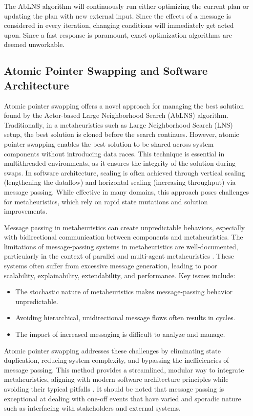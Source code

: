 The AbLNS algorithm will continuously run either optimizing the current plan or updating the plan 
with new external input. Since the effects of a message is considered in every iteration, changing 
conditions will immediately get acted upon. Since a fast response is paramount, exact optimization algorithms are deemed unworkable.

\subsection{Atomic Pointer Swapping and Software Architecture}
Atomic pointer swapping offers a novel approach for managing the best
solution found by the Actor-based Large Neighborhood Search (AbLNS) algorithm.
Traditionally, in a metaheuristics such as Large Neighborhood Search (LNS) setup, 
the best solution
is cloned before the search continues. However, atomic pointer swapping enables
the best solution to be shared across system components without introducing data
races. This technique is essential in multithreaded environments, as it ensures
the integrity of the solution during swaps. In software architecture, scaling
is often achieved through vertical scaling (lengthening the dataflow) and
horizontal scaling (increasing throughput) via message passing. While effective
in many domains, this approach poses challenges for metaheuristics, which
rely on rapid state mutations and solution improvements. 

Message passing in metaheuristics can create unpredictable behaviors,
especially with bidirectional communication between components and metaheuristics. The
limitations of message-passing systems in metaheuristics are well-documented,
particularly in the context of parallel and multi-agent metaheuristics
\citep{talbiMetaheuristicsDesignImplementation2009}. These systems often
suffer from excessive message generation, leading to poor scalability,
explainability, extendability, and performance. Key issues include: 

\begin{itemize} 
	\item The stochastic nature
		of metaheuristics makes message-passing behavior unpredictable. 
	\item Avoiding
		hierarchical, unidirectional message flows often results in cycles. 
	\item The
		impact of increased messaging is difficult to analyze and manage. 
\end{itemize}

Atomic pointer swapping addresses these challenges by eliminating state
duplication, reducing system complexity, and bypassing the inefficiencies of
message passing. This method provides a streamlined, modular way to integrate
metaheuristics, aligning with modern software architecture principles while
avoiding their typical pitfalls \citep{richards_fundamentals_2020}. It should
be noted that message passing is exceptional at dealing with one-off events that
have varied and sporadic nature such as interfacing with stakeholders and external
systems.


